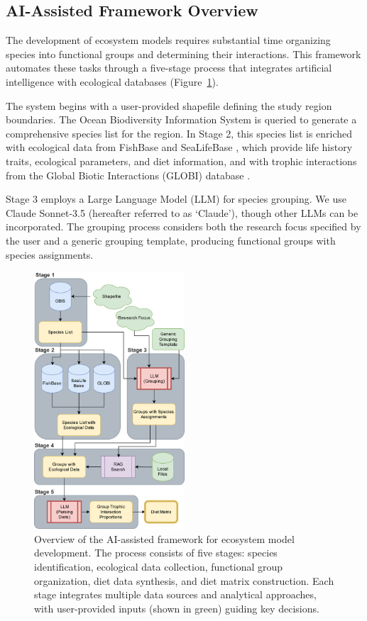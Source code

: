 \subsection{AI-Assisted Framework Overview}

The development of ecosystem models requires substantial time organizing species into functional groups and determining their interactions. This framework automates these tasks through a five-stage process that integrates artificial intelligence with ecological databases (Figure~\ref{fig:framework_overview}).

The system begins with a user-provided shapefile defining the study region boundaries. The Ocean Biodiversity Information System \citep{Grassle1999} is queried to generate a comprehensive species list for the region. In Stage 2, this species list is enriched with ecological data from FishBase and SeaLifeBase \citep{froese2010fishbase}, which provide life history traits, ecological parameters, and diet information, and with trophic interactions from the Global Biotic Interactions (GLOBI) database \citep{Poelen2014}.

Stage 3 employs a Large Language Model (LLM) for species grouping. We use Claude Sonnet-3.5 (hereafter referred to as `Claude')\citep{Anthropic2024}, though other LLMs can be incorporated. The grouping process considers both the research focus specified by the user and a generic grouping template, producing functional groups with species assignments.

\begin{figure}[htbp]
    \centering
    \includegraphics[width=0.5\textwidth]{figures/EwE_AI.drawio.png}
    \caption{Overview of the AI-assisted framework for ecosystem model development. The process consists of five stages: species identification, ecological data collection, functional group organization, diet data synthesis, and diet matrix construction. Each stage integrates multiple data sources and analytical approaches, with user-provided inputs (shown in green) guiding key decisions.}
    \label{fig:framework_overview}
\end{figure}

